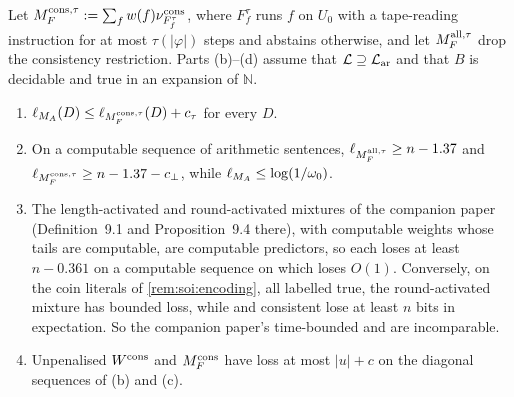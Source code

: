 \begin{theorem}\label{thm:soi:onetapetime}
Let $M_{F}^{\mathrm{cons},\tau}:=\sum_fw(f)\nu^{\mathrm{cons}}_{F^\tau_f}$, where $F^\tau_f$ runs $f$ on $U_0$ with a tape-reading instruction for at most $\tau(\lvert\varphi\rvert)$ steps and abstains otherwise, and let $M_{F}^{\mathrm{all},\tau}$ drop the consistency restriction. Parts (b)--(d) assume that $\mathcal L\supseteq\mathcal{L}_{\mathrm{ar}}$ and that $B$ is decidable and true in an expansion of $\mathbb N$.
\begin{enumerate}[label=(\alph*),leftmargin=*]
\item $\ell_{M_{A}}(D)\le\ell_{M_{F}^{\mathrm{cons},\tau}}(D)+c_\tau$ for every $D$.
\item On a computable sequence of arithmetic sentences, $\ell_{M_{F}^{\mathrm{all},\tau}}\ge n-1.37$ and $\ell_{M_{F}^{\mathrm{cons},\tau}}\ge n-1.37-c_\bot$, while $\ell_{M_{A}}\le\log(1/\omega_0)$.
\item The length-activated and round-activated mixtures of the companion paper (Definition~9.1 and Proposition~9.4 there), with computable weights whose tails are computable, are computable predictors, so each loses at least $n-0.361$ on a computable sequence on which \SAIabbr loses $O(1)$. Conversely, on the coin literals of \cref{rem:soi:encoding}, all labelled true, the round-activated mixture has bounded loss, while \SAIabbr and consistent \SOIabbr lose at least $n$ bits in expectation. So the companion paper's time-bounded \SOIabbr and \SAIabbr are incomparable.
\item Unpenalised $W^{\mathrm{cons}}$ and $M_{F}^{\mathrm{cons}}$ have loss at most $\lvert u\rvert+c$ on the diagonal sequences of (b) and (c).
\end{enumerate}
\end{theorem}

